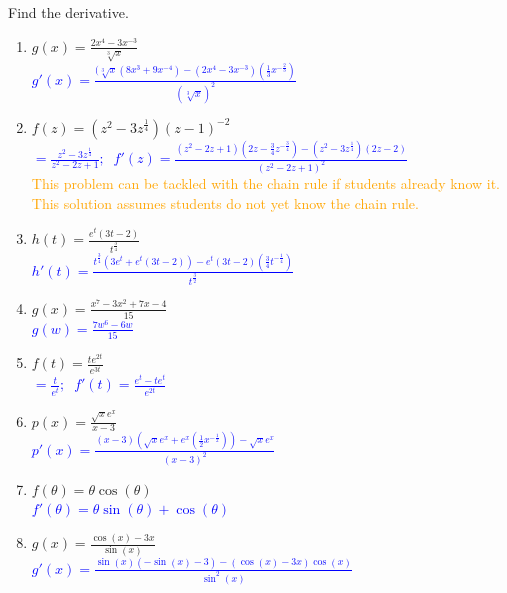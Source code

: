 \documentclass{ximera}
\begin{document}
    
\begin{exercise}
    Find the derivative.
        \begin{enumerate}
            \item $g(x)=\frac{2x^4-3x^{-3}}{\sqrt[3]{x}}$\\
            \textcolor{blue}{ $g'(x)=\frac{(\sqrt[3]{x}(8x^3+9x^{-4})-(2x^4-3x^{-3})(\frac{1}{3}x^{-\frac{2}{3}})}{(\sqrt[3]{x})^2}$}

            \item $f(z)=(z^2-3z^{\frac{1}{4}})(z-1)^{-2}$\\
            \textcolor{blue}{ $=\frac{z^2-3z^{\frac{1}{4}}}{z^2-2z+1};\;\; f'(z)=\frac{(z^2-2z+1)(2z-\frac{3}{4}z^{-\frac{3}{4}})-(z^2-3z^{\frac{1}{4}})(2z-2)}{(z^2-2z+1)^2}$}\\
            \textcolor{orange}{This problem can be tackled with the chain rule if students already know it.  This solution assumes students do not yet know the chain rule.}

            \item $h(t)=\frac{e^t(3t-2)}{t^{\frac{3}{4}}}$\\
            \textcolor{blue}{ $h'(t)=\frac{t^{\frac{3}{4}}(3e^t+e^t(3t-2))-e^t(3t-2)(\frac{3}{4}t^{-\frac{1}{4}})}{t^{\frac{3}{2}}}$}

            \item $g(x)=\frac{x^7-3x^2+7x-4}{15}$ \\
            \textcolor{blue}{ $g(w)=\frac{7w^6-6w}{15}$}

            \item $f(t)=\frac{te^{2t}}{e^{3t}}$\\
            \textcolor{blue}{ $=\frac{t}{e^t};\;\; f'(t)=\frac{e^t-te^t}{e^{2t}}$}

            \item $p(x)=\frac{\sqrt{x}e^x}{x-3}$\\
            \textcolor{blue}{ $p'(x)=\frac{(x-3)(\sqrt{x}e^x+e^x(\frac{1}{2}x^{-\frac{1}{2}}))-\sqrt{x}e^x}{(x-3)^2}$}

            \item $f(\theta)=\theta\cos(\theta)$\\
            \textcolor{blue}{$f'(\theta)=\theta \sin(\theta)+\cos(\theta)$}

            \item $g(x)=\frac{\cos(x)-3x}{\sin(x)}$\\
            \textcolor{blue}{$g'(x)=\frac{\sin(x)(-\sin(x)-3)-(\cos(x)-3x)\cos(x)}{\sin^2(x)}$}


\end{enumerate}
\end{exercise}
\end{document}
